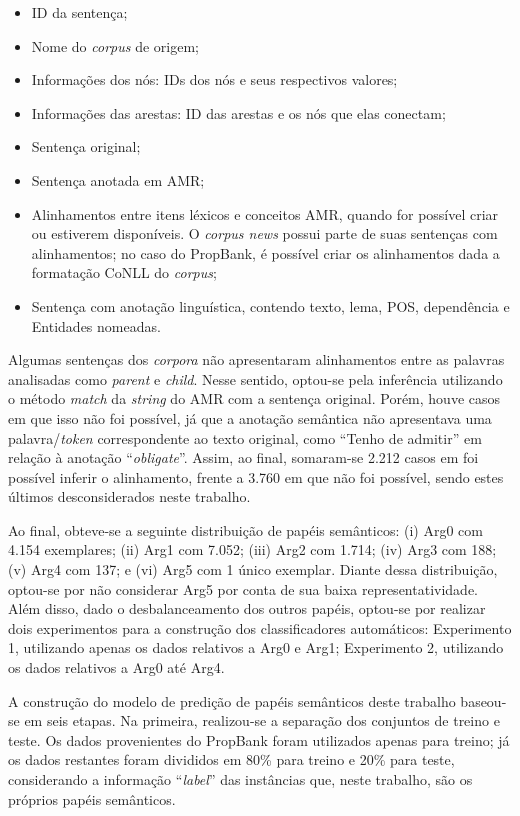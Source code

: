 \begin{itemize}
\item ID da sentença;
\item Nome do \emph{corpus} de origem;
\item Informações dos nós: IDs dos nós e seus respectivos valores;
\item Informações das arestas: ID das arestas e os nós que elas conectam;
\item Sentença original;
\item Sentença anotada em AMR;
\item Alinhamentos entre itens léxicos e conceitos AMR, quando for possível
  criar ou estiverem disponíveis. O \emph{corpus news} possui parte de
  suas sentenças com alinhamentos; no caso do PropBank, é possível criar
  os alinhamentos dada a formatação CoNLL do \emph{corpus};
\item Sentença com anotação linguística, contendo texto, lema, POS,
  dependência e Entidades nomeadas.
\end{itemize}

Algumas sentenças dos \emph{corpora} não apresentaram alinhamentos entre
as palavras analisadas como \emph{parent} e \emph{child}. Nesse sentido,
optou-se pela inferência utilizando o método \emph{match} da
\emph{string} do AMR com a sentença original. Porém, houve casos em que
isso não foi possível, já que a anotação semântica não apresentava uma
palavra/\emph{token} correspondente ao texto original, como ``Tenho de
admitir'' em relação à anotação ``\emph{obligate}''. Assim, ao final,
somaram-se 2.212 casos em foi possível inferir o alinhamento, frente a
3.760 em que não foi possível, sendo estes últimos desconsiderados neste
trabalho.

Ao final, obteve-se a seguinte distribuição de papéis semânticos: (i)
Arg0 com 4.154 exemplares; (ii) Arg1 com 7.052; (iii) Arg2 com 1.714;
(iv) Arg3 com 188; (v) Arg4 com 137; e (vi) Arg5 com 1 único exemplar.
Diante dessa distribuição, optou-se por não considerar Arg5 por conta de
sua baixa representatividade. Além disso, dado o desbalanceamento dos
outros papéis, optou-se por realizar dois experimentos para a construção
dos classificadores automáticos: Experimento 1, utilizando apenas os
dados relativos a Arg0 e Arg1; Experimento 2, utilizando os dados
relativos a Arg0 até Arg4.

A construção do modelo de predição de papéis semânticos deste trabalho
baseou-se em seis etapas. Na primeira, realizou-se a separação dos
conjuntos de treino e teste. Os dados provenientes do PropBank foram
utilizados apenas para treino; já os dados restantes foram divididos em
80\% para treino e 20\% para teste, considerando a informação
``\emph{label}'' das instâncias que, neste trabalho, são os próprios
papéis semânticos.

